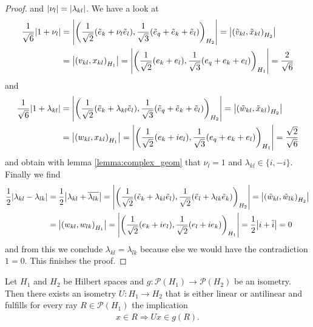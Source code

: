 \begin{proof}
	and ${\left | \nu_l \right |} = {\left | \lambda_{kl} \right |}$. We have a look at 
	\begin{align*}
		\frac{1}{\sqrt{6}}{\left | 1 + \nu_l \right |} &= {\left | {\left ( \frac{1}{\sqrt{2}}(\tilde{e}_k + \nu_l \tilde{e}_l), \frac{1}{\sqrt{3}}(\tilde{e}_q + \tilde{e}_k + \tilde{e}_l) \right )}_{H_2} \right |} = {\left | {\left ( \tilde{v}_{kl}, \tilde{x}_{kl} \right )}_{H_2} \right |} \\
		&= {\left | {\left ( v_{kl}, x_{kl} \right )}_{H_1} \right |} = {\left | {\left ( \frac{1}{\sqrt{2}}(e_k + e_l), \frac{1}{\sqrt{3}}(e_q + e_k + e_l) \right )}_{H_1} \right |} = \frac{2}{\sqrt{6}}
	\end{align*}
	and 
	\begin{align*}
		\frac{1}{\sqrt{6}}{\left | 1 + \lambda_{kl} \right |} &= {\left | {\left ( \frac{1}{\sqrt{2}}(\tilde{e}_k + \lambda_{kl} \tilde{e}_l), \frac{1}{\sqrt{3}}(\tilde{e}_q + \tilde{e}_k + \tilde{e}_l) \right )}_{H_2} \right |} = {\left | {\left ( \tilde{w}_{kl}, \tilde{x}_{kl} \right )}_{H_2} \right |} \\
		&= {\left | {\left ( w_{kl}, x_{kl} \right )}_{H_1} \right |} = {\left | {\left ( \frac{1}{\sqrt{2}}(e_k + i e_l), \frac{1}{\sqrt{3}}(e_q + e_k + e_l) \right )}_{H_1} \right |} = \frac{\sqrt{2}}{\sqrt{6}}
	\end{align*}
	and obtain with lemma \ref{lemma:complex_geom} that $\nu_l = 1$ and $\lambda_{kl} \in \{i, -i\}$. Finally we find
	\begin{align*}
		\frac{1}{2}{\left | \lambda_{kl} - \lambda_{lk} \right |} &= \frac{1}{2}{\left | \lambda_{kl} + \overline{\lambda_{lk}} \right |} = {\left | {\left ( \frac{1}{\sqrt{2}}(\tilde{e}_k + \lambda_{kl} \tilde{e}_l), \frac{1}{\sqrt{2}}(\tilde{e}_l + \lambda_{lk} \tilde{e}_k) \right )}_{H_2} \right |} = {\left | {\left ( \tilde{w}_{kl}, \tilde{w}_{lk} \right )}_{H_2} \right |} \\
		&= {\left | {\left ( w_{kl}, w_{lk} \right )}_{H_1} \right |} = {\left | {\left ( \frac{1}{\sqrt{2}}(e_k + i e_l), \frac{1}{\sqrt{2}}(e_l + i e_k) \right )}_{H_1} \right |} = \frac{1}{2} {\left | i + \overline{i} \right |} = 0
	\end{align*}
	and from this we conclude $\lambda_{kl} = \lambda_{lk}$ because else we would have the contradiction $1 = 0$. This finishes the proof.
\end{proof}


\begin{theorem} \label{theorem:wigner}
	Let $H_1$ and $H_2$ be Hilbert spaces and $g: \mathcal{P}(H_1) \to \mathcal{P}(H_2)$ be an isometry. Then there exists an isometry $U: H_1 \to H_2$ that is either linear or antilinear and fulfills for every ray $R \in \mathcal{P}(H_1)$ the implication
	\begin{align*}
		x \in R \Rightarrow Ux \in g(R).
	\end{align*}
\end{theorem}


